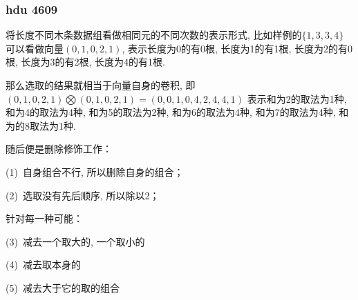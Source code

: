         \subsubsection{hdu 4609}\small
将长度不同木条数据组看做相同元的不同次数的表示形式, 比如样例的$\{1, 3, 3, 4\}$
可以看做向量$(0, 1, 0, 2, 1)$, 表示长度为0的有0根, 长度为1的有1根, 长度为2的有0根, 
长度为3的有2根, 长度为4的有1根.

那么选取的结果就相当于向量自身的卷积, 即
$(0, 1, 0, 2, 1)\bigotimes (0, 1, 0, 2, 1) = (0, 0, 1, 0, 4, 2, 4, 4, 1)$
表示和为2的取法为1种, 和为4的取法为4种, 和为5的取法为2种, 和为6的取法为4种, 
和为7的取法为4种, 和为的8取法为1种.

随后便是删除修饰工作：

(1)\ 自身组合不行, 所以删除自身的组合；

(2)\ 选取没有先后顺序, 所以除以2；

针对每一种可能：

(3)\ 减去一个取大的, 一个取小的

(4)\ 减去取本身的

(5)\ 减去大于它的取的组合



